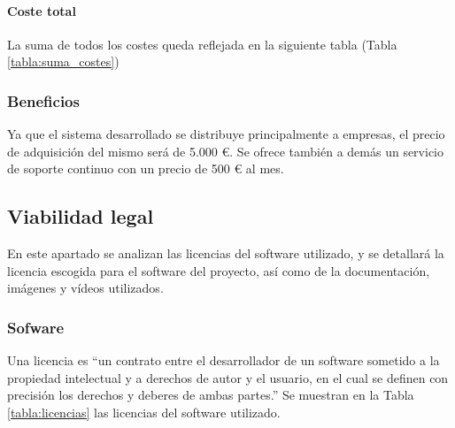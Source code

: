 \paragraph{Coste total}

La suma de todos los costes queda reflejada en la siguiente tabla (Tabla \ref{tabla:suma_costes})


\subsubsection{Beneficios}

Ya que el sistema desarrollado se distribuye principalmente a empresas, el precio de adquisición del
mismo será de 5.000 €. Se ofrece también a demás un servicio de soporte continuo con un precio de 
500 € al mes.

\subsection{Viabilidad legal}

En este apartado se analizan las licencias del software utilizado, y se detallará la licencia 
escogida para el software del proyecto, así como de la documentación, imágenes y vídeos utilizados.

\subsubsection{Sofware}

Una licencia es ``un contrato entre el desarrollador de un software sometido a la propiedad
intelectual y a derechos de autor y el usuario, en el cual se definen con precisión los 
derechos y deberes de ambas partes.'' \cite{labrador2012tipos}
Se muestran en la Tabla \ref{tabla:licencias} las licencias del software utilizado.


